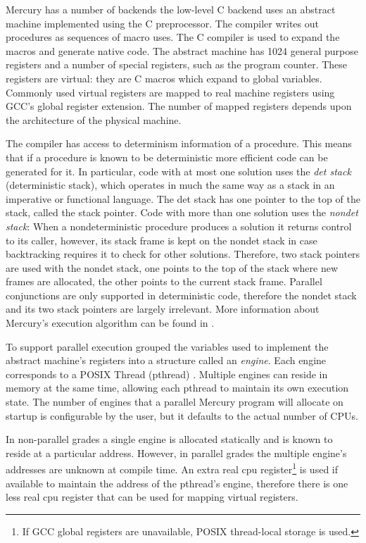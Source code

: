 
Mercury has a number of backends
the low-level C backend uses an abstract machine implemented using the C
preprocessor.
The compiler writes out procedures as sequences of macro uses.
The C compiler is used to expand the macros and generate native code.
The abstract machine has 1024 general purpose registers and a number of
special registers, such as the program counter.
These registers are virtual:
they are C macros which expand to global variables.
Commonly used virtual registers are mapped to real machine registers
using GCC's \citep{gcc} global register extension.
The number of mapped registers depends upon the architecture of the physical
machine.

The compiler has access to determinism information of a procedure.
This means that if a procedure is known to be deterministic more efficient
code can be generated for it.
In particular,
code with at most one solution uses the \emph{det stack} (deterministic
stack),
which operates in much the same way as a stack in an imperative or
functional language.
The det stack has one pointer to the top of the stack,
called the stack pointer.
Code with more than one solution uses the \emph{nondet stack}:
When a nondeterministic procedure produces a solution it returns control to
its caller,
however, its stack frame is kept on the nondet stack in case backtracking
requires it to check for other solutions.
Therefore,
two stack pointers are used with the nondet stack,
one points to the top of the stack where new frames are allocated,
the other points to the current stack frame.
Parallel conjunctions are only supported in deterministic code,
therefore the nondet stack and its two stack pointers are largely irrelevant.
More information about Mercury's execution algorithm can be found in
\citet{mercury_jlp}.

To support parallel execution \citet{conway_par} grouped the variables
used to implement the abstract machine's registers into a structure
called an \emph{engine}.
Each engine corresponds to a POSIX Thread (pthread)
\citep{butenhof1997:pthreads}.
Multiple engines can reside in memory at the same time,
allowing each pthread to maintain its own execution state.
The number of engines that a parallel Mercury program will allocate on startup
is configurable by the user,
but it defaults to the actual number of CPUs.

In non-parallel grades a single engine is allocated statically and is known
to reside at a particular address.
However,
in parallel grades the multiple engine's addresses are unknown at compile
time.
An extra real cpu register\footnote{
    If GCC global registers are unavailable,
    POSIX thread-local storage is used.
}
is used if available to maintain the address of
the pthread's engine,
therefore there is one less real cpu register that can be used for mapping
virtual registers.

